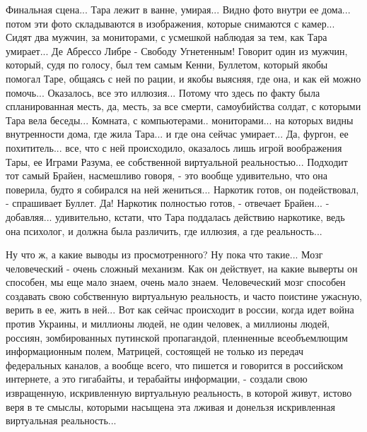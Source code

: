 Финальная сцена... Тара лежит в ванне, умирая... Видно фото внутри ее дома...
потом эти фото складываются в изображения, которые снимаются с камер... Сидят
два мужчин, за мониторами, с усмешкой наблюдая за тем, как Тара умирает... Де
Абрессо Либре - Свободу Угнетенным! Говорит один из мужчин, который, судя по
голосу, был тем самым Кенни, Буллетом, который якобы помогал Таре, общаясь с
ней по рации, и якобы выясняя, где она, и как ей можно помочь... Оказалось, все
это иллюзия... Потому что здесь по факту была спланированная месть, да, месть,
за все смерти, самоубийства солдат, с которыми Тара вела беседы...  Комната, с
компьютерами.. мониторами... на которых видны внутренности дома, где жила
Тара...  и где она сейчас умирает... Да, фургон, ее похититель... все, что с
ней происходило, оказалось лишь игрой воображения Тары, ее Играми Разума, ее
собственной виртуальной реальностью...  Подходит тот самый Брайен, насмешливо
говоря, - это вообще удивительно, что она поверила, будто я собирался на ней
жениться... Наркотик готов, он подействовал, - спрашивает Буллет. Да! Наркотик
полностью готов, - отвечает Брайен... - добавляя... удивительно, кстати, что
Тара поддалась действию наркотике, ведь она психолог, и должна была различить,
где иллюзия, а где реальность... 

Ну что ж, а какие выводы из просмотренного? Ну пока что такие...  Мозг
человеческий - очень сложный механизм.  Как он действует, на какие выверты он
способен, мы еще мало знаем, очень мало знаем. Человеческий мозг способен
создавать свою собственную виртуальную реальность, и часто поистине ужасную,
верить в ее, жить в ней... Вот как сейчас происходит в россии, когда идет война
против Украины, и миллионы людей, не один человек, а миллионы людей, россиян,
зомбированных путинской пропагандой, пленненные всеобъемлющим информационным
полем, Матрицей, состоящей не только из передач федеральных каналов, а вообще
всего, что пишется и говорится в российском интернете, а это гигабайты, и
терабайты информации, - создали свою извращенную, искривленную виртуальную
реальность, в которой живут, истово веря в те смыслы, которыми насыщена эта
лживая и донельзя искривленная виртуальная реальность...

